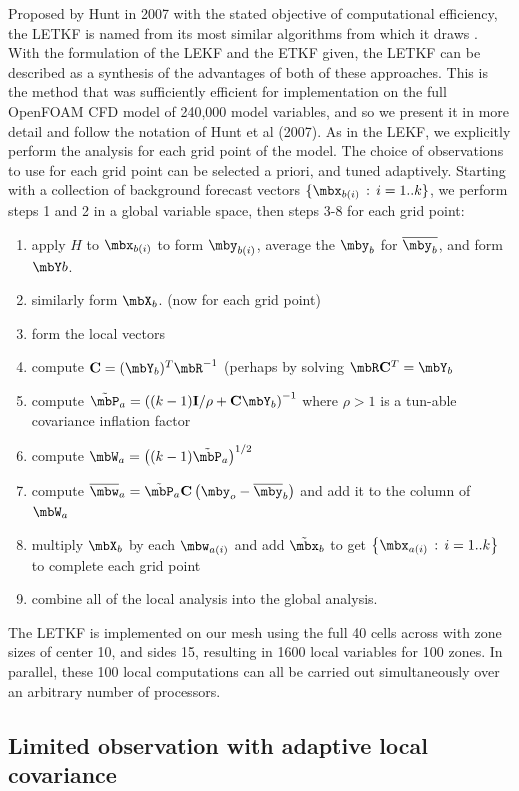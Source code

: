 Proposed by Hunt in 2007 with the stated objective of computational efficiency, the LETKF is named from its most similar algorithms from which it draws \cite{hunt2007efficient}.
With the formulation of the LEKF and the ETKF given, the LETKF can be  described as a synthesis of the advantages of both of these approaches.
This is the method that was sufficiently efficient for implementation on the full OpenFOAM CFD model of 240,000 model variables, and so we present it in more detail and follow the notation of Hunt et al (2007). 
As in the LEKF, we explicitly perform the analysis for each grid point of the model.
The choice of observations to use for each grid point can be selected a priori, and tuned adaptively.
Starting with a collection of background forecast vectors $\{ \mbx_{b(i)} \,:\,i=1..k \}$, we perform steps 1 and 2 in a global variable space, then steps 3-8 for each grid point:
\begin{enumerate}
\item apply $H$ to $\mbx_{b(i)}$ to form $\mby_{b(i)}$, average the $\mby_b$ for $\overline{\mby_b}$, and form $\mbY b$.
\item similarly form $\mbX_b$. (now for each grid point)
\item form the local vectors
\item compute $\mathbf{C}=(\mbY_b)^T\mbR^{-1}$ (perhaps by solving $\mbR \mathbf{C}^T = \mbY_b$
\item compute $\tilde{\mbP}_a = \left( (k-1)\mathbf{I} / \rho + \mathbf{C} \mbY _b \right ) ^{-1}$ where $\rho > 1$ is a tun-able covariance inflation factor
\item compute $\mbW_a = \left ( (k-1) \tilde{\mbP} _a \right ) ^{1/2}$
\item compute $\overline{\mbw} _a  = \tilde{\mbP}_a \mathbf{C} \left ( \mby_o - \overline{\mby} _b \right )$ and add it to the column of $\mbW_a$
\item multiply $\mbX_b$ by each $\mbw_{a(i)}$ and add $\tilde{\mbx}_b$ to get $\left\{ \mbx_{a(i)}\,:\,i=1..k\right \}$ to complete each grid point
\item combine all of the local analysis into the global analysis.
\end{enumerate}
The LETKF is implemented on our mesh using the full 40 cells across with zone sizes of center 10, and sides 15, resulting in 1600 local variables for 100 zones.
In parallel, these 100 local computations can all be carried out simultaneously over an arbitrary number of processors.

\subsection{Limited observation with adaptive local covariance}

